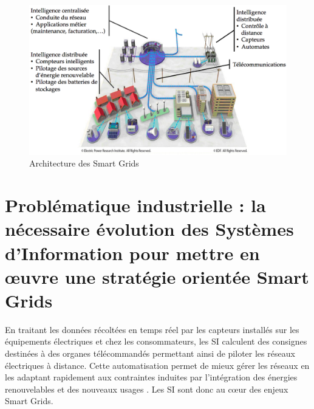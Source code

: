 \begin{figure}[!htbp]
 \begin{center}
  \includegraphics[width=1\textwidth]{images/problematique/archiSmartgrids.png}
 \end{center}
 \caption{Architecture des Smart Grids \protect\cite{favre2006ingenierie}}
 \label{fig:archismartgrids}
\end{figure}



\section{Problématique industrielle : la nécessaire évolution des Systèmes 
d'Information pour mettre en œuvre une stratégie orientée Smart Grids}


En traitant les données récoltées en temps réel par les capteurs installés sur 
les équipements électriques et chez les consommateurs, les SI calculent des 
consignes destinées à des organes 
télécommandés permettant ainsi de piloter les réseaux électriques à distance. 
Cette automatisation permet de mieux gérer les réseaux en les adaptant 
rapidement aux contraintes induites par l'intégration des énergies renouvelables 
et des nouveaux usages \cite{cre}. Les SI sont donc au cœur des enjeux Smart Grids.  

